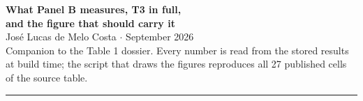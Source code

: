 \documentclass[10pt,a4paper]{article}
\begin{document}
\begin{center}
{\LARGE\bfseries What Panel B measures, T3 in full,}\\[2pt]
{\LARGE\bfseries and the figure that should carry it}\\[8pt]
{\normalsize José Lucas de Melo Costa \quad$\cdot$ September 2026}\\[4pt]
{\footnotesize Companion to the Table 1 dossier. Every number is read from the stored results at
build time; the script that draws the figures reproduces all 27 published cells of the source table.}
\end{center}
\vspace{4pt}
\hrule
\vspace{10pt}






\end{document}
